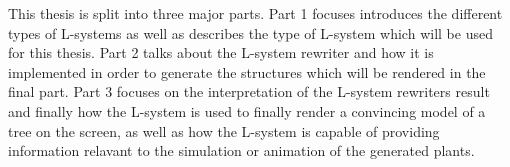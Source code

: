 \begin{flushleft}

This thesis is split into three major parts. Part 1 focuses introduces the different types of L-systems as well as describes the type of L-system which will be used for this thesis. Part 2 talks about the L-system rewriter and how it is implemented in order to generate the structures which will be rendered in the final part. Part 3 focuses on the interpretation of the L-system rewriters result and finally how the L-system is used to finally render a convincing model of a tree on the screen, as well as how the L-system is capable of providing information relavant to the simulation or animation of the generated plants.

\end{flushleft}





